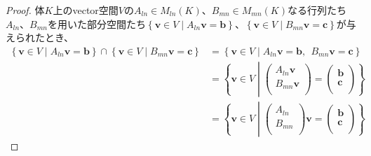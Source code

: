 \documentclass[dvipdfmx]{jsarticle}
\begin{document}
\begin{proof}
体$K$上のvector空間$V$の$A_{ln} \in M_{ln}(K)$、$B_{mn} \in M_{mn}(K)$なる行列たち$A_{ln}$、$B_{mn}$を用いた部分空間たち$\left\{ \mathbf{v} \in V \middle| A_{ln}\mathbf{v} = \mathbf{b} \right\}$、$\left\{ \mathbf{v} \in V \middle| B_{mn}\mathbf{v} = \mathbf{c} \right\}$が与えられたとき、
\begin{align*}
\left\{ \mathbf{v} \in V \middle| A_{ln}\mathbf{v} = \mathbf{b} \right\} \cap \left\{ \mathbf{v} \in V \middle| B_{mn}\mathbf{v} = \mathbf{c} \right\} &= \left\{ \mathbf{v} \in V \middle| A_{ln}\mathbf{v} = \mathbf{b},\ \ B_{mn}\mathbf{v} = \mathbf{c} \right\}\\
&= \left\{ \mathbf{v} \in V \middle| \begin{pmatrix}
A_{ln}\mathbf{v} \\
B_{mn}\mathbf{v} \\
\end{pmatrix} = \begin{pmatrix}
\mathbf{b} \\
\mathbf{c} \\
\end{pmatrix} \right\}\\
&= \left\{ \mathbf{v} \in V \middle| \begin{pmatrix}
A_{ln} \\
B_{mn} \\
\end{pmatrix}\mathbf{v} = \begin{pmatrix}
\mathbf{b} \\
\mathbf{c} \\
\end{pmatrix} \right\}
\end{align*}
\end{proof}
\end{document}
